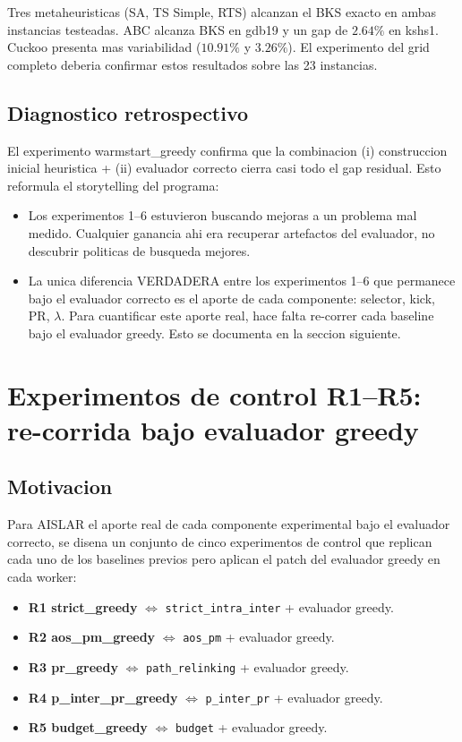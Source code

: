 Tres metaheuristicas (SA, TS Simple, RTS) alcanzan el BKS exacto en
ambas instancias testeadas. ABC alcanza BKS en gdb19 y un gap de
$2.64\%$ en kshs1. Cuckoo presenta mas variabilidad
($10.91\%$ y $3.26\%$). El experimento del grid completo
deberia confirmar estos resultados sobre las 23 instancias.

\subsection{Diagnostico retrospectivo}

El experimento warmstart\_greedy confirma que la combinacion
(i) construccion inicial heuristica + (ii) evaluador correcto cierra
casi todo el gap residual. Esto reformula el storytelling del programa:

\begin{itemize}
\item Los experimentos 1--6 estuvieron buscando mejoras a un
  problema mal medido. Cualquier ganancia ahi era recuperar
  artefactos del evaluador, no descubrir politicas de busqueda mejores.
\item La unica diferencia VERDADERA entre los experimentos 1--6 que
  permanece bajo el evaluador correcto es el aporte de cada
  componente: selector, kick, PR, $\lambda$. Para cuantificar este
  aporte real, hace falta re-correr cada baseline bajo el evaluador
  greedy. Esto se documenta en la seccion siguiente.
\end{itemize}

\section{Experimentos de control R1--R5: re-corrida bajo evaluador greedy}
\label{sec:re-greedy}

\subsection{Motivacion}

Para AISLAR el aporte real de cada componente experimental bajo el
evaluador correcto, se disena un conjunto de cinco experimentos de
control que replican cada uno de los baselines previos pero aplican el
patch del evaluador greedy en cada worker:

\begin{itemize}
\item \textbf{R1 strict\_greedy} $\Leftrightarrow$ \texttt{strict\_intra\_inter}
  + evaluador greedy.
\item \textbf{R2 aos\_pm\_greedy} $\Leftrightarrow$ \texttt{aos\_pm}
  + evaluador greedy.
\item \textbf{R3 pr\_greedy} $\Leftrightarrow$ \texttt{path\_relinking}
  + evaluador greedy.
\item \textbf{R4 p\_inter\_pr\_greedy} $\Leftrightarrow$ \texttt{p\_inter\_pr}
  + evaluador greedy.
\item \textbf{R5 budget\_greedy} $\Leftrightarrow$ \texttt{budget}
  + evaluador greedy.
\end{itemize}

